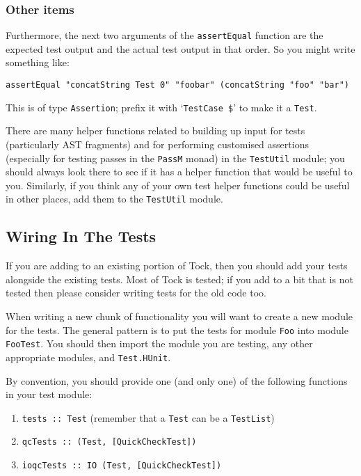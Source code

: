 \documentclass[a4wide]{article}
\begin{document}
\subsubsection{Other items}

Furthermore, the next two arguments of the \lstinline|assertEqual| function are the expected test output
and the actual test output in that order.  So you might write something like:

\begin{lstlisting}
assertEqual "concatString Test 0" "foobar" (concatString "foo" "bar")
\end{lstlisting}

This is of type \lstinline|Assertion|; prefix it with `\lstinline|TestCase $|' to make it a \lstinline|Test|.

There are many helper functions related to building up input for tests (particularly AST fragments)
and for performing customised assertions (especially for testing passes in the \lstinline|PassM| monad)
in the \lstinline|TestUtil| module; you should always look there to see if it has a helper function
that would be useful to you.  Similarly, if you think any of your own test helper functions could be
useful in other places, add them to the \lstinline|TestUtil| module.

\subsection{Wiring In The Tests}

If you are adding to an existing portion of Tock, then you should add your tests alongside the existing
tests.  Most of Tock is tested; if you add to a bit that is not tested then please consider writing
tests for the old code too.

When writing a new chunk of functionality you will want to create a new module for the tests.  The general
pattern is to put the tests for module \lstinline|Foo| into module  \lstinline|FooTest|.  You should
then import the module you are testing, any other appropriate modules, and \lstinline|Test.HUnit|.

By convention, you should provide one (and only one) of the following functions in your test module:

\begin{enumerate}
\item \lstinline|tests :: Test|  (remember that a \lstinline|Test| can be a \lstinline|TestList|)
\item \lstinline|qcTests :: (Test, [QuickCheckTest])|
\item \lstinline|ioqcTests :: IO (Test, [QuickCheckTest])|
\end{enumerate}
\end{document}
